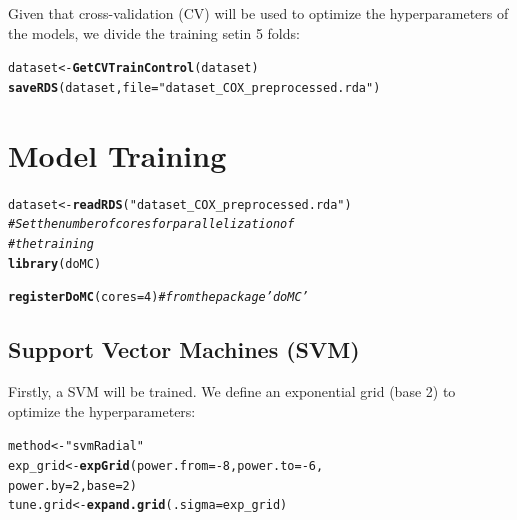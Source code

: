 \documentclass[twoside,a4wide,12pt]{article}\usepackage[]{graphicx}\usepackage[]{color}
\makeatletter
\newcommand{\hlnum}[1]{\textcolor[rgb]{0.686,0.059,0.569}{#1}}%
\newcommand{\hlstr}[1]{\textcolor[rgb]{0.192,0.494,0.8}{#1}}%
\newcommand{\hlcom}[1]{\textcolor[rgb]{0.678,0.584,0.686}{\textit{#1}}}%
\newcommand{\hlopt}[1]{\textcolor[rgb]{0,0,0}{#1}}%
\newcommand{\hlstd}[1]{\textcolor[rgb]{0.345,0.345,0.345}{#1}}%
\newcommand{\hlkwb}[1]{\textcolor[rgb]{0.69,0.353,0.396}{#1}}%
\newcommand{\hlkwc}[1]{\textcolor[rgb]{0.333,0.667,0.333}{#1}}%
\newcommand{\hlkwd}[1]{\textcolor[rgb]{0.737,0.353,0.396}{\textbf{#1}}}%
\newenvironment{kframe}{%
 \def\at@end@of@kframe{}%
 \ifinner\ifhmode%
  \def\at@end@of@kframe{\end{minipage}}%
  \begin{minipage}{\columnwidth}%
 \fi\fi%
 \def\FrameCommand##1{\hskip\@totalleftmargin \hskip-\fboxsep
 \colorbox{shadecolor}{##1}\hskip-\fboxsep
     \hskip-\linewidth \hskip-\@totalleftmargin \hskip\columnwidth}%
 \MakeFramed {\advance\hsize-\width
   \@totalleftmargin\z@ \linewidth\hsize
   \@setminipage}}%
 {\par\unskip\endMakeFramed%
 \at@end@of@kframe}
\newenvironment{knitrout}{}{} %
\makeatother
\begin{document}
Given that cross-validation (CV) will be used to optimize the hyperparameters of the models, we divide the training setin 5 folds:
\begin{knitrout}
\color{fgcolor}\begin{kframe}
\begin{alltt}
\hlstd{dataset} \hlkwb{<-} \hlkwd{GetCVTrainControl}\hlstd{(dataset)}
\hlkwd{saveRDS}\hlstd{(dataset,} \hlkwc{file} \hlstd{=} \hlstr{"dataset_COX_preprocessed.rda"}\hlstd{)}
\end{alltt}
\end{kframe}
\end{knitrout}


\section{Model Training}

\begin{knitrout}
\color{fgcolor}\begin{kframe}
\begin{alltt}
\hlstd{dataset} \hlkwb{<-} \hlkwd{readRDS}\hlstd{(}\hlstr{"dataset_COX_preprocessed.rda"}\hlstd{)}
\hlcom{# Set the number of cores for parallelization of}
\hlcom{# the training}
\hlkwd{library}\hlstd{(doMC)}
\end{alltt}


{\ttfamily\noindent\itshape\color{messagecolor}{\#\# Loading required package: iterators}}\begin{alltt}
\hlkwd{registerDoMC}\hlstd{(}\hlkwc{cores} \hlstd{=} \hlnum{4}\hlstd{)}  \hlcom{#from the package 'doMC'}
\end{alltt}
\end{kframe}
\end{knitrout}


\subsection{Support Vector Machines (SVM)}
Firstly, a SVM will be trained. We define an exponential grid (base 2) to optimize the hyperparameters:

\begin{knitrout}
\color{fgcolor}\begin{kframe}
\begin{alltt}
\hlstd{method} \hlkwb{<-} \hlstr{"svmRadial"}
\hlstd{exp_grid} \hlkwb{<-} \hlkwd{expGrid}\hlstd{(}\hlkwc{power.from} \hlstd{=} \hlopt{-}\hlnum{8}\hlstd{,} \hlkwc{power.to} \hlstd{=} \hlopt{-}\hlnum{6}\hlstd{,}
    \hlkwc{power.by} \hlstd{=} \hlnum{2}\hlstd{,} \hlkwc{base} \hlstd{=} \hlnum{2}\hlstd{)}
\hlstd{tune.grid} \hlkwb{<-} \hlkwd{expand.grid}\hlstd{(}\hlkwc{.sigma} \hlstd{= exp_grid)}
\end{alltt}
\end{kframe}
\end{knitrout}
\end{document}
